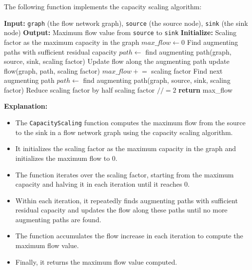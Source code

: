 \documentclass[12pt]{book} %
\begin{document}
The following function implements the capacity scaling algorithm:
\FloatBarrier
\begin{algorithm}
\caption{Capacity Scaling}\label{capacity-scaling}
\begin{algorithmic}[1]
    \State \textbf{Input:} \texttt{graph} (the flow network graph), \texttt{source} (the source node), \texttt{sink} (the sink node)
    \State \textbf{Output:} Maximum flow value from \texttt{source} to \texttt{sink}
    \State \textbf{Initialize:} Scaling factor as the maximum capacity in the graph
    \State $max\_flow \gets 0$
        \State Find augmenting paths with sufficient residual capacity
        \State $path \gets$ find augmenting path(graph, source, sink, scaling factor)
            \State Update flow along the augmenting path
            \State update flow(graph, path, scaling factor)
            \State $max\_flow \mathrel{+}= $ scaling factor
            \State Find next augmenting path
            \State $path \gets$ find augmenting path(graph, source, sink, scaling factor)
        \EndWhile
        \State Reduce scaling factor by half
        \State scaling factor $\mathrel{//=} 2$
    \EndWhile
    \State \textbf{return} max\_flow
\EndProcedure
\end{algorithmic}
\end{algorithm}
\FloatBarrier
\textbf{Explanation:}
\begin{itemize}
    \item The \texttt{CapacityScaling} function computes the maximum flow from the source to the sink in a flow network graph using the capacity scaling algorithm.
    \item It initializes the scaling factor as the maximum capacity in the graph and initializes the maximum flow to 0.
    \item The function iterates over the scaling factor, starting from the maximum capacity and halving it in each iteration until it reaches 0.
    \item Within each iteration, it repeatedly finds augmenting paths with sufficient residual capacity and updates the flow along these paths until no more augmenting paths are found.
    \item The function accumulates the flow increase in each iteration to compute the maximum flow value.
    \item Finally, it returns the maximum flow value computed.
\end{itemize}
\end{document}
